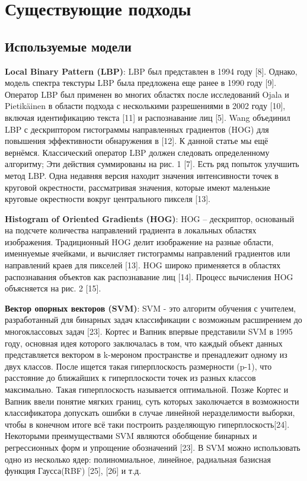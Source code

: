 \documentclass[12pt,twoside]{article}
\begin{document}
\section{Существующие подходы}
\subsection{Используемые модели}
\textbf{Local Binary Pattern (LBP)}: LBP был представлен в 1994 году [8]. Однако, модель спектра текстуры LBP была предложена еще ранее в 1990 году [9]. Оператор LBP был применен во многих областях после исследований Ojala и Pietikäinen в области подхода с несколькими разрешениями в 2002 году [10], включая идентификацию текста [11] и распознавание лиц [5]. Wang объединил LBP с дескриптором гистограммы направленных градиентов (HOG) для повышения эффективности обнаружения в [12]. К данной статье мы ещё вернёмся. Классический оператор LBP должен следовать определенному алгоритму; Эти действия суммированы на рис. 1 [7]. Есть ряд попыток улучшить метод LBP. Одна недавняя версия находит значения интенсивности точек в круговой окрестности, рассматривая значения, которые имеют маленькие круговые окрестности вокруг центрального пикселя [13].

\textbf{Histogram of Oriented Gradients (HOG)}: HOG -- дескриптор, основаный на подсчете количества направлений градиента в локальных областях изображения. Традиционный HOG делит изображение на разные области, именнуемые ячейками, и вычисляет гистограммы направлений градиентов или направлений краев для пикселей [13]. HOG широко применяется в областях распознавания объектов как распознавание лиц [14]. Процесс вычисления HOG объясняется на рис. 2 [15].

\textbf{Вектор опорных векторов (SVM)}: SVM - это алгоритм обучения с учителем, разработанный для бинарных задач классификации с возможным расширением до многоклассовых задач [23]. Кортес и Вапник впервые представили SVM в 1995 году, основная идея которого заключалась в том, что каждый объект данных представляется вектором в k-мероном пространстве и пренадлежит одному из двух классов. После ищется такая гиперплоскость размерности (p-1), что расстояние до ближайших к гиперплоскости точек из разных классов максимально. Такая гиперплоскость называется оптимальной. Позже Кортес и Вапник ввели понятие мягких границ, суть которых заколючается в возможности классификатора допускать ошибки в случае линейной неразделимости выборки, чтобы в конечном итоге всё таки построить разделяющую гиперплоскость[24]. Некоторыми преимуществами SVM являются обобщение бинарных и регрессионных форм и упрощение обозначений [23]. В SVM можно использовать одно из несколько ядер: полиномиальное, линейное, радиальная базисная функция Гаусса(RBF) [25], [26] и т.д.
\end{document}
